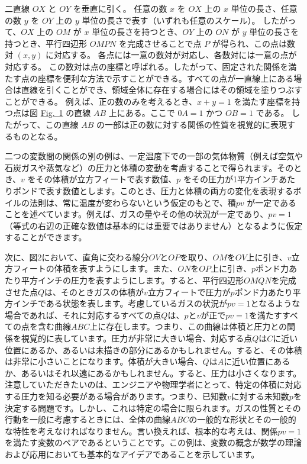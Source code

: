 \documentclass[a4paper,11pt,openany]{ltjsbook}
\providecommand{\Fig}[2][Fig.]{\hyperref[fig:#2]{#1~#2}}
\begin{document}
二直線 $OX$ と $OY$ を垂直に引く。
任意の数 $x$ を $OX$ 上の $x$ 単位の長さ、任意の数 $y$ を $OY$ 上の $y$ 単位の長さで表す（いずれも任意のスケール）。
したがって、$OX$ 上の $OM$ が $x$ 単位の長さを持つとき、$OY$ 上の $ON$ が $y$ 単位の長さを持つとき、平行四辺形 $OMPN$ を完成させることで点 $P$ が得られ、この点は数対 $(x, y)$ に対応する。
各点には一意の数対が対応し、各数対には一意の点が対応する。
この数対は点の座標と呼ばれる。したがって、固定された関係を満たす点の座標を便利な方法で示すことができる。すべての点が一直線上にある場合は直線を引くことができ、領域全体に存在する場合にはその領域を塗りつぶすことができる。
例えば、正の数のみを考えるとき、$x + y = 1$ を満たす座標を持つ点は図 \Fig{1} の直線 $AB$ 上にある。ここで $0A = 1$ かつ $OB = 1$ である。
したがって、この直線 $AB$ の一部は正の数に対する関係の性質を視覚的に表現するものとなる。

二つの変数間の関係の別の例は、一定温度下での一部の気体物質（例えば空気や石炭ガスや蒸気など）の圧力と体積の変動を考慮することで得られます。そのとき、$v$ をその体積が立方フィートで表す数値、$p$ をその圧力が1平方インチあたりポンドで表す数値とします。このとき、圧力と体積の両方の変化を表現するボイルの法則は、常に温度が変わらないという仮定のもとで、積$pv$ が一定であることを述べています。例えば、ガスの量やその他の状況が一定であり、$pv = 1$（等式の右辺の正確な数値は基本的には重要ではありません）となるように仮定することができます。

次に、図2において、直角に交わる線分$OV$と$OP$を取り、$OM$を$OV$上に引き、$v$立方フィートの体積を表すようにします。また、$ON$を$OP$上に引き、$p$ポンド力あたり平方インチの圧力を表すようにします。すると、平行四辺形$OMQN$を完成させた点$Q$は、そのときガスの体積が$v$立方フィートで圧力が$p$ポンド力あたり平方インチである状態を表します。考慮しているガスの状況が$pv = 1$となるような場合であれば、それに対応するすべての点$Q$は、$p$と$v$が正で$pv = 1$を満たすすべての点を含む曲線$ABC$上に存在します。つまり、この曲線は体積と圧力との関係を視覚的に表しています。圧力が非常に大きい場合、対応する点$Q$は$C$に近い位置にあるか、あるいは未描きの部分にあるかもしれません。すると、その体積は非常に小さいことになります。体積が大きい場合、$Q$は$A$に近い位置にあるか、あるいはそれ以遠にあるかもしれません。すると、圧力は小さくなります。注意していただきたいのは、エンジニアや物理学者にとって、特定の体積に対応する圧力を知る必要がある場合があります。つまり、已知数$v$に対する未知数$p$を決定する問題です。しかし、これは特定の場合に限られます。ガスの性質とその行動を一般に考慮するときには、全体の曲線$ABC$の一般的な形状とその一般的な特性を考えなければなりません。言い換えれば、根本的な考えは、関係$pv = 1$を満たす変数のペアであるということです。この例は、変数の概念が数学の理論および応用においても基本的なアイデアであることを示しています。
\end{document}
